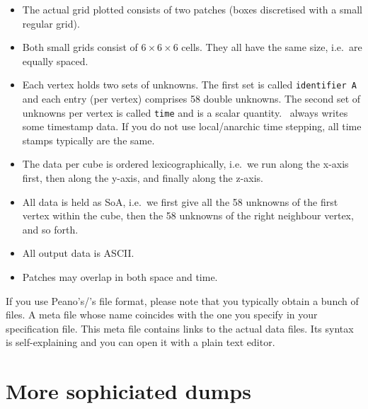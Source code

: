 \begin{itemize}
  \item The actual grid plotted consists of two patches (boxes discretised with
  a small regular grid).
  \item Both small grids consist of $6 \times 6 \times 6$ cells. They all have
  the same size, i.e.~are equally spaced. 
  \item Each vertex holds two sets of unknowns. The first set is called
  \texttt{identifier A} and each entry (per vertex) comprises 58 double
  unknowns. The second set of unknowns per vertex is called \texttt{time} and is
  a scalar quantity.
  \exahype\ always writes some timestamp data.
  If you do not use local/anarchic time stepping, all time stamps
  typically are the same.
  \item The data per cube is ordered lexicographically, i.e.~we run along the
  x-axis first, then along the y-axis, and finally along the z-axis. 
  \item All data is held as SoA, i.e.~we first give all the 58 unknowns of the
  first vertex within the cube, then the 58 unknowns of the right neighbour
  vertex, and so forth.
  \item All output data is ASCII.
  \item Patches may overlap in both space and time.
\end{itemize}


\noindent
If you use Peano's/\exahype's file format, please note that you typically obtain
a bunch of files. 
A meta file whose name coincides with the one you specify in your specification
file. 
This meta file contains links to the actual data files. 
Its syntax is self-explaining and you can open it with a plain text editor.


\section{More sophiciated dumps}

